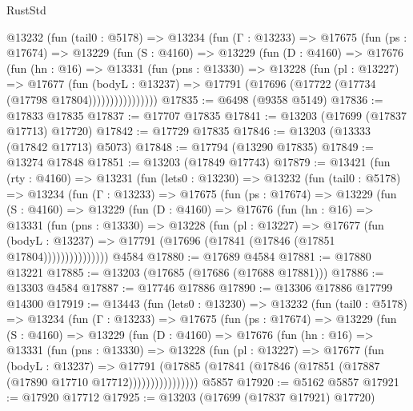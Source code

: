 \begin{lexlean}{RustStd}
\begin{coremodule}
        @13232
          (fun (tail0 : @5178) =>
          @13234
            (fun (Γ : @13233) =>
            @17675
              (fun (ps : @17674) =>
              @13229
                (fun (S : @4160) =>
                @13229
                  (fun (D : @4160) =>
                  @17676
                    (fun (hn : @16) =>
                    @13331
                      (fun (pns : @13330) =>
                      @13228
                        (fun (pl : @13227) =>
                        @17677
                          (fun (bodyL : @13237) =>
                          @17791 (@17696 (@17722 (@17734 (@17798 @17804))))))))))))))))
@17835 := @6498 (@9358 @5149)
@17836 := @17833 @17835
@17837 := @17707 @17835
@17841 := @13203 (@17699 (@17837 @17713) @17720)
@17842 := @17729 @17835
@17846 := @13203 (@13333 (@17842 @17713) @5073)
@17848 := @17794 (@13290 @17835)
@17849 := @13274 @17848
@17851 := @13203 (@17849 @17743)
@17879 := @13421
    (fun (rty : @4160) =>
    @13231
      (fun (lets0 : @13230) =>
      @13232
        (fun (tail0 : @5178) =>
        @13234
          (fun (Γ : @13233) =>
          @17675
            (fun (ps : @17674) =>
            @13229
              (fun (S : @4160) =>
              @13229
                (fun (D : @4160) =>
                @17676
                  (fun (hn : @16) =>
                  @13331
                    (fun (pns : @13330) =>
                    @13228
                      (fun (pl : @13227) =>
                      @17677
                        (fun (bodyL : @13237) =>
                        @17791 (@17696 (@17841 (@17846 (@17851 @17804)))))))))))))))
    @4584
@17880 := @17689 @4584
@17881 := @17880 @13221
@17885 := @13203 (@17685 (@17686 (@17688 @17881)))
@17886 := @13303 @4584
@17887 := @17746 @17886
@17890 := @13306 @17886 @17799 @14300
@17919 := @13443
    (fun (lets0 : @13230) =>
    @13232
      (fun (tail0 : @5178) =>
      @13234
        (fun (Γ : @13233) =>
        @17675
          (fun (ps : @17674) =>
          @13229
            (fun (S : @4160) =>
            @13229
              (fun (D : @4160) =>
              @17676
                (fun (hn : @16) =>
                @13331
                  (fun (pns : @13330) =>
                  @13228
                    (fun (pl : @13227) =>
                    @17677
                      (fun (bodyL : @13237) =>
                      @17791
                        (@17885
                          (@17841 (@17846 (@17851 (@17887 (@17890 @17710 @17712))))))))))))))))
    @5857
@17920 := @5162 @5857
@17921 := @17920 @17712
@17925 := @13203 (@17699 (@17837 @17921) @17720)

\end{coremodule}
\end{lexlean}
